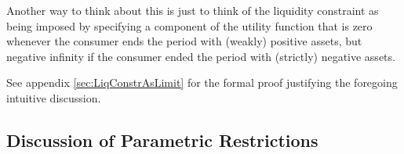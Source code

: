 \documentclass[./BufferStockTheory.tex]{subfiles}
\begin{document}
Another way to think about this is just to think of the liquidity
constraint as being imposed by specifying a component of the utility
function that is zero whenever the consumer ends the period with
(weakly) positive assets, but negative infinity if the consumer
ended the period with (strictly) negative assets.

See appendix \ref{sec:LiqConstrAsLimit} for the formal proof justifying the
foregoing intuitive discussion.

\hypertarget{Discussion-of-Parametric-Restrictions}{}
\subsection{Discussion of Parametric Restrictions}\label{sec:discussConvergence}

\begin{comment}
\subsubsection{Perfect Foresight Case}

The unconstrained perfect foresight model is the natural starting
point for developing the intuition behind our parametric restrictions.
As noted above, the Return Impatience Condition (\RIC) is necessary in
this context to guarantee that the PDV of the stream of future
consumption is finite; value is then given by
\begin{align*}
  \vLevBF_{t}  & = \uFunc(\cLevBF_{t})+\DiscFac \uFunc(\overbrace{(\Rfree \DiscFac)^{1/\CRRA}\cLevBF_{t}}^{=\cLevBF_{t+1}})+\DiscFac^{2} \uFunc(((\Rfree \DiscFac)^{1/\CRRA})^{2}\cLevBF_{t})+...
\\  & = \uFunc(\cLevBF_{t})\left(1+\DiscFac ((\Rfree \DiscFac)^{1/\CRRA})^{1-\CRRA}+(\DiscFac ((\Rfree \DiscFac)^{1/\CRRA})^{1-\CRRA})^{2}+...\right)
\end{align*}
which has a finite limit so long as $\DiscFac ((\Rfree \DiscFac)^{1/\CRRA})^{1-\CRRA} < 1$.  But
\begin{align*}
\DiscFac ({\Pat})^{1-\CRRA}   & = \DiscFac (\DiscFac \Rfree)^{1/\CRRA - 1}
\\  & = {\Pat}/\Rfree = \PatR
\end{align*}
so the \RIC~guarantees the finiteness of value in addition to the PDV
of consumption (given a finite starting point).

The starting point for consumption is guaranteed to be finite by
imposition of the finite human wealth (\FHWC) requirement.  (If human
wealth were unbounded, our unconstrained consumer could freely borrow
in order to spend an infinite amount in every period.)


\end{comment}
\end{document}
